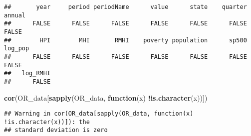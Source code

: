 \documentclass[
]{article}
\newenvironment{Shaded}{\begin{snugshade}}{\end{snugshade}}
\newcommand{\ControlFlowTok}[1]{\textcolor[rgb]{0.13,0.29,0.53}{\textbf{#1}}}
\newcommand{\KeywordTok}[1]{\textcolor[rgb]{0.13,0.29,0.53}{\textbf{#1}}}
\newcommand{\NormalTok}[1]{#1}
\newcommand{\OperatorTok}[1]{\textcolor[rgb]{0.81,0.36,0.00}{\textbf{#1}}}
\begin{document}
\begin{verbatim}
##       year     period periodName      value      state    quarter     annual 
##      FALSE      FALSE      FALSE      FALSE      FALSE      FALSE      FALSE 
##        HPI        MHI       RMHI    poverty population      sp500    log_pop 
##      FALSE      FALSE      FALSE      FALSE      FALSE      FALSE      FALSE 
##   log_RMHI 
##      FALSE
\end{verbatim}

\begin{Shaded}
\begin{Highlighting}[]
\KeywordTok{cor}\NormalTok{(OR_data[}\KeywordTok{sapply}\NormalTok{(OR_data, }\ControlFlowTok{function}\NormalTok{(x) }\OperatorTok{!}\KeywordTok{is.character}\NormalTok{(x))])}
\end{Highlighting}
\end{Shaded}

\begin{verbatim}
## Warning in cor(OR_data[sapply(OR_data, function(x) !is.character(x))]): the
## standard deviation is zero
\end{verbatim}
\end{document}
